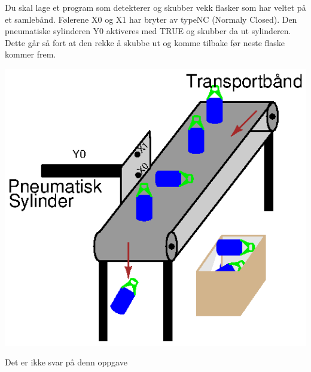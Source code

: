 

Du skal lage et program som detekterer og skubber vekk flasker som
har veltet på et samlebånd. Følerene X0 og X1 har bryter av typeNC (Normaly Closed). Den pneumatiske sylinderen Y0 aktiveres med TRUE og skubber da ut sylinderen. Dette går så fort at den rekke å skubbe ut og komme tilbake før neste flaske kommer frem. 

\includegraphics[width=1\textwidth]{i08002x01.eps}





Det er ikke svar på denn oppgave













